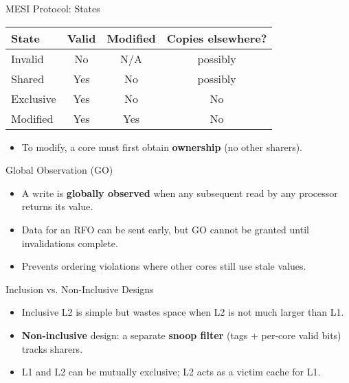 \documentclass[aspectratio=169,12pt]{beamer}
\begin{document}
\begin{frame}{MESI Protocol: States}
\begin{center}
\begin{tabular}{lccc}
\toprule
State & Valid & Modified & Copies elsewhere?\\
\midrule
Invalid   & No  & N/A  & possibly\\
Shared    & Yes & No   & possibly\\
Exclusive & Yes & No   & No\\
Modified  & Yes & Yes  & No\\
\bottomrule
\end{tabular}
\end{center}
\begin{itemize}
  \item To modify, a core must first obtain \textbf{ownership} (no other sharers).
\end{itemize}
\end{frame}

\begin{frame}{Global Observation (GO)}
\begin{itemize}
  \item A write is \textbf{globally observed} when any subsequent read by any processor returns its value.
  \item Data for an RFO can be sent early, but GO cannot be granted until invalidations complete.
  \item Prevents ordering violations where other cores still use stale values.
\end{itemize}
\end{frame}

\begin{frame}{Inclusion vs. Non-Inclusive Designs}
\begin{itemize}
  \item Inclusive L2 is simple but wastes space when L2 is not much larger than L1.
  \item \textbf{Non-inclusive} design: a separate \textbf{snoop filter} (tags + per-core valid bits) tracks sharers.
  \item L1 and L2 can be mutually exclusive; L2 acts as a victim cache for L1.
\end{itemize}
\end{frame}
\end{document}
